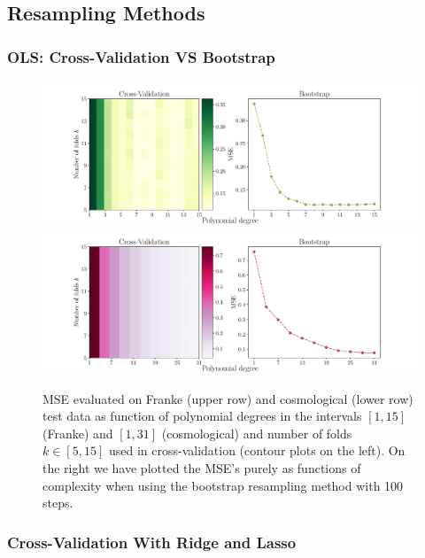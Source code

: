 \documentclass[aps,pra,english,notitlepage,reprint,nofootinbib]{revtex4-1}  %
\begin{document}
\subsection{Resampling Methods}
\subsubsection{OLS: Cross-Validation VS Bootstrap}


\begin{figure}
  \vspace*{-5pt}
  \centering %
  \includegraphics[trim = 0 0.8cm 0 0,clip,width=\textwidth,keepaspectratio]{../figs/f_kfold_vs_bootstrap.pdf}
  \centering
  \includegraphics[width=\textwidth]{../figs/g_kfold_vs_bootstrap.pdf}
  \caption{MSE evaluated on Franke (upper row) and cosmological (lower row) test data as function of polynomial degrees in the intervals $[1,15]$ (Franke) and $[1, 31]$ (cosmological) and number of folds $k\in[5, 15]$ used in cross-validation (contour plots on the left). On the right we have plotted the MSE's purely as functions of complexity when using the bootstrap resampling method with 100 steps.}\label{fig:kfold vs bootstrap}
  \vspace*{-5pt}
\end{figure}

\subsubsection{Cross-Validation With Ridge and Lasso}
\end{document}
